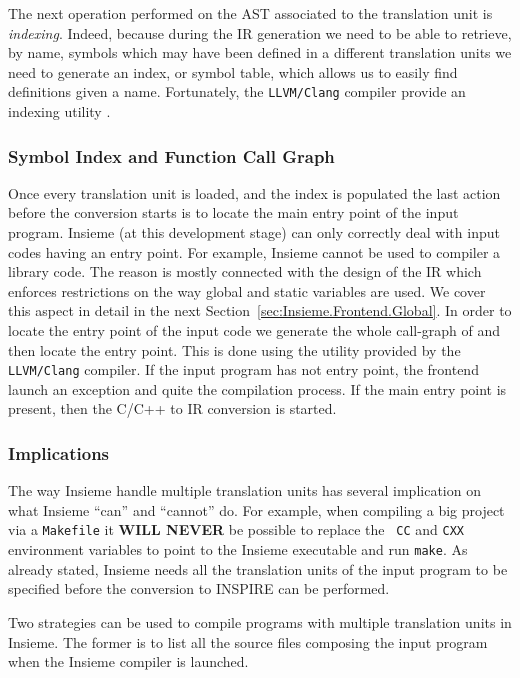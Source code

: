 The next operation performed on the AST associated to the translation unit is
\emph{indexing}. Indeed, because during the IR generation we need to be able to
retrieve, by name, symbols which may have been defined in a different
translation units we need to generate an index, or symbol table, which allows us
to easily find definitions given a name. Fortunately, the {\tt LLVM/Clang}
compiler provide an indexing utility .

\subsubsection{Symbol Index and Function Call Graph}
Once every translation unit is loaded, and the index is populated the last
action before the conversion starts is to locate the main entry point of the
input program. Insieme (at this development stage) can only correctly deal with
input codes having an entry point. For example, Insieme cannot be used to
compiler a library code. The reason is mostly connected with the design
of the IR which enforces restrictions on the way global and static variables are
used. We cover this aspect in detail in the next
Section~\ref{sec:Insieme.Frontend.Global}. In order to locate the entry point of
the input code we generate the whole call-graph of and then locate the entry
point. This is done using the  utility provided by the
{\tt LLVM/Clang} compiler. If the input program has not entry point, the
frontend launch an exception and quite the compilation process. If the main
entry point is present, then the C/C++ to IR conversion is started. 

\subsubsection{Implications}
The way Insieme handle multiple translation units has several implication on
what Insieme ``can'' and ``cannot'' do. For example, when compiling a big
project via a {\tt Makefile} it {\bf WILL NEVER} be possible to replace the {\tt
CC} and {\tt CXX} environment variables to point to the Insieme executable and
run {\tt make}. As already stated, Insieme needs all the translation units of
the input program to be specified before the conversion to INSPIRE can be
performed. 

Two strategies can be used to compile programs with multiple translation units 
in Insieme. The former is to list all the source files composing the input
program when the Insieme compiler is launched. 

